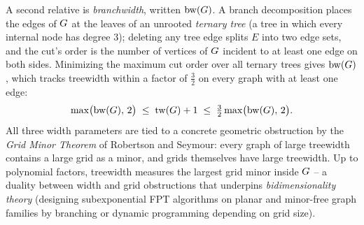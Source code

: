 A second relative is \emph{branchwidth}, written $\operatorname{bw}(G)$. A
branch decomposition places the edges of $G$ at the leaves of an unrooted
\emph{ternary tree} (a tree in which every internal node has degree $3$); deleting
any tree edge splits $E$ into two edge sets, and the cut's order is the number of
vertices of $G$ incident to at least one edge on both sides. Minimizing the
maximum cut order over all ternary trees gives $\operatorname{bw}(G)$, which tracks
treewidth within a factor of $\tfrac32$ on every graph with at least one edge:
\[
  \max\bigl(\operatorname{bw}(G),\,2\bigr)
  \;\le\; \operatorname{tw}(G)+1
  \;\le\; \tfrac{3}{2}\max\bigl(\operatorname{bw}(G),\,2\bigr).
\]
All three width parameters are tied to a concrete geometric obstruction by the
\emph{Grid Minor Theorem} of Robertson and Seymour: every graph of large treewidth
contains a large grid as a minor, and grids themselves have large treewidth. Up to
polynomial factors, treewidth measures the largest grid minor inside $G$ -- a
duality between width and grid obstructions that underpins
\emph{bidimensionality theory} (designing subexponential FPT algorithms on planar
and minor-free graph families by branching or dynamic programming depending on grid
size).

